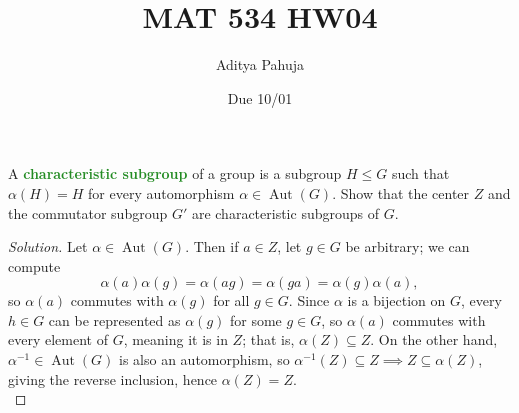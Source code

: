 \documentclass[10pt]{article}
\title{MAT 534 HW04}
\author{\large Aditya Pahuja}
\date{\large Due 10/01}
\providecommand{\inv}{^{-1}}
\newenvironment{soln}{\begin{proof}[Solution]}{\end{proof}}
\providecommand{\aut}{\operatorname{Aut}}
\providecommand{\vocab}[1]{{\textbf{\textcolor{ForestGreen}{#1}}}}
\begin{document}
\maketitle

\begin{problem}
    A \vocab{characteristic subgroup} of a group is a subgroup $H\le G$
    such that $\alpha(H) = H$ for every automorphism $\alpha\in\aut(G)$.
    Show that the center $Z$ and the commutator subgroup $G'$
    are characteristic subgroups of $G$.
\end{problem}

\begin{soln}
    Let $\alpha\in\aut(G)$. Then if $a\in Z$, let $g\in G$ be arbitrary;
    we can compute
    \begin{equation*}
        \alpha(a)\alpha(g) = \alpha(ag) = \alpha(ga) = \alpha(g)\alpha(a),
    \end{equation*}
    so $\alpha(a)$ commutes with $\alpha(g)$ for all $g\in G$.
    Since $\alpha$ is a bijection on $G$,
    every $h\in G$ can be represented as $\alpha(g)$ for some $g\in G$,
    so $\alpha(a)$ commutes with every element of $G$, meaning it is in $Z$;
    that is, $\alpha(Z) \subseteq Z$. On the other hand,
    $\alpha\inv\in\aut(G)$ is also an automorphism, so
    $\alpha\inv(Z)\subseteq Z\implies Z\subseteq \alpha(Z)$,
    giving the reverse inclusion, hence $\alpha(Z) = Z$.
    \\


\end{soln}
\end{document}
